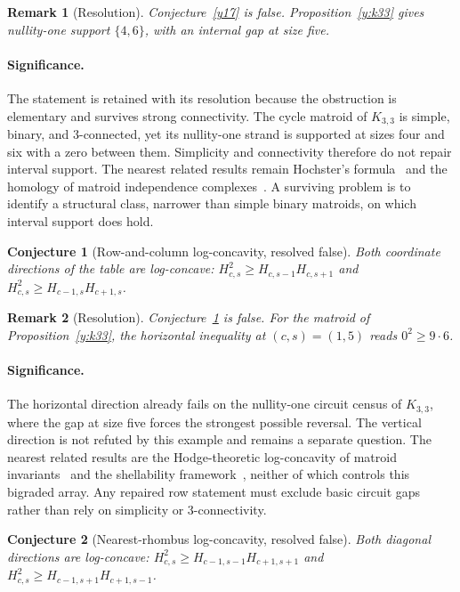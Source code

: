 \documentclass[11pt]{article}
\newtheorem{conjecture}{Conjecture}
\newtheorem{remark}{Remark}
\theoremstyle{definition}
\begin{document}
\begin{remark}[Resolution]\label{y17:res}
Conjecture~\ref{y17} is false.  Proposition~\ref{y:k33} gives nullity-one support $\{4,6\}$, with an internal gap at size five.
\end{remark}

\paragraph{Significance.}
The statement is retained with its resolution because the obstruction is elementary and survives strong connectivity.  The cycle matroid of $K_{3,3}$ is simple, binary, and $3$-connected, yet its nullity-one strand is supported at sizes four and six with a zero between them.  Simplicity and connectivity therefore do not repair interval support.  The nearest related results remain Hochster's formula~\cite{Hoch77} and the homology of matroid independence complexes~\cite{Bjo92}.  A surviving problem is to identify a structural class, narrower than simple binary matroids, on which interval support does hold.

\begin{conjecture}[Row-and-column log-concavity, resolved false]\label{y18}
Both coordinate directions of the table are log-concave: $H_{c,s}^2\ge H_{c,s-1}H_{c,s+1}$ and $H_{c,s}^2\ge H_{c-1,s}H_{c+1,s}$.
\end{conjecture}

\begin{remark}[Resolution]\label{y18:res}
Conjecture~\ref{y18} is false.  For the matroid of Proposition~\ref{y:k33}, the horizontal inequality at $(c,s)=(1,5)$ reads $0^2\ge9\cdot6$.
\end{remark}

\paragraph{Significance.}
The horizontal direction already fails on the nullity-one circuit census of $K_{3,3}$, where the gap at size five forces the strongest possible reversal.  The vertical direction is not refuted by this example and remains a separate question.  The nearest related results are the Hodge-theoretic log-concavity of matroid invariants~\cite{AHK18} and the shellability framework~\cite{Bjo92}, neither of which controls this bigraded array.  Any repaired row statement must exclude basic circuit gaps rather than rely on simplicity or $3$-connectivity.

\begin{conjecture}[Nearest-rhombus log-concavity, resolved false]\label{y19}
Both diagonal directions are log-concave: $H_{c,s}^2\ge H_{c-1,s-1}H_{c+1,s+1}$ and $H_{c,s}^2\ge H_{c-1,s+1}H_{c+1,s-1}$.
\end{conjecture}
\end{document}
